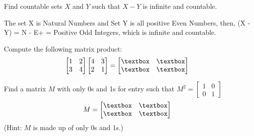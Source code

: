 \nextq
Find countable sets $X$ and $Y$ such that $X - Y$ is
infinite and countable.
\begin{answerlong}
The set X is Natural Numbers and Set Y is all positive Even Numbers, 
then, (X - Y) = N - E+ = Positive Odd Integers, which is infinite and countable.
\end{answerlong}

\nextq
Compute the following matrix product:
\[
\begin{bmatrix}
1 & 2 \\
3 & 4 
\end{bmatrix}
\begin{bmatrix}
4 & 3 \\
2 & 1 
\end{bmatrix}
=
\begin{bmatrix}
\answerbox{} & \answerbox{} \\
\answerbox{} & \answerbox{}
\end{bmatrix}
\]

\nextq
Find
a matrix $M$ 
with only 0s and 1s for entry
such that $M^2 =
\begin{bmatrix}
1 & 0 \\
0 & 1 
\end{bmatrix}
$
\[
M = 
\begin{bmatrix}
\answerbox{} & \answerbox{} \\
\answerbox{} & \answerbox{}
\end{bmatrix}
\]
(Hint: $M$ is made up of only 0s and 1s.)
\newpage


